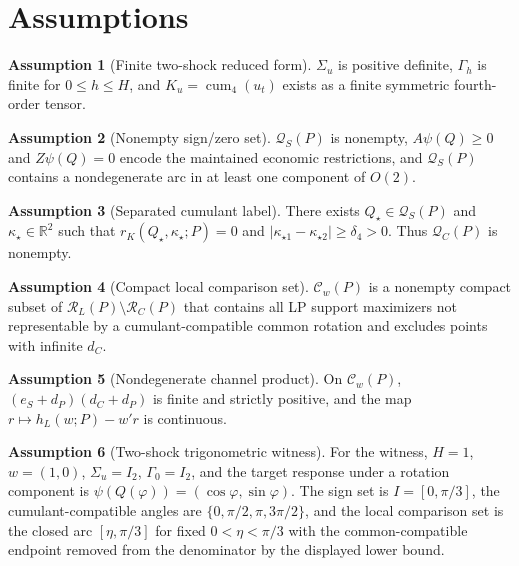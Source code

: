 \documentclass[11pt]{article}
\newcommand{\R}{\mathbb{R}}
\theoremstyle{definition}
\newtheorem{assumption}{Assumption}
\theoremstyle{plain}
\theoremstyle{remark}
\begin{document}
\section{Assumptions}
\begin{assumption}[Finite two-shock reduced form]\label{ass:finite-two}
\(\Sigma_u\) is positive definite, \(\Gamma_h\) is finite for \(0\le h\le H\), and \(K_u=\operatorname{cum}_4(u_t)\) exists as a finite symmetric fourth-order tensor.
\end{assumption}

\begin{assumption}[Nonempty sign/zero set]\label{ass:sign-zero}
\(\mathcal Q_S(P)\) is nonempty, \(A\psi(Q)\ge0\) and \(Z\psi(Q)=0\) encode the maintained economic restrictions, and \(\mathcal Q_S(P)\) contains a nondegenerate arc in at least one component of \(O(2)\).
\end{assumption}

\begin{assumption}[Separated cumulant label]\label{ass:cumulant-label}
There exists \(Q_\star\in\mathcal Q_S(P)\) and \(\kappa_\star\in\R^2\) such that \(r_K(Q_\star,\kappa_\star;P)=0\) and \(|\kappa_{\star1}-\kappa_{\star2}|\ge\delta_4>0\). Thus \(\mathcal Q_C(P)\) is nonempty.
\end{assumption}

\begin{assumption}[Compact local comparison set]\label{ass:compact-comparison}
\(\mathcal C_w(P)\) is a nonempty compact subset of \(\mathcal R_L(P)\setminus\mathcal R_C(P)\) that contains all LP support maximizers not representable by a cumulant-compatible common rotation and excludes points with infinite \(d_C\).
\end{assumption}

\begin{assumption}[Nondegenerate channel product]\label{ass:channel-product}
On \(\mathcal C_w(P)\), \((e_S+d_P)(d_C+d_P)\) is finite and strictly positive, and the map \(r\mapsto h_L(w;P)-w'r\) is continuous.
\end{assumption}

\begin{assumption}[Two-shock trigonometric witness]\label{ass:trig-witness}
For the witness, \(H=1\), \(w=(1,0)\), \(\Sigma_u=I_2\), \(\Gamma_0=I_2\), and the target response under a rotation component is \(\psi(Q(\varphi))=(\cos\varphi,\sin\varphi)\). The sign set is \(I=[0,\pi/3]\), the cumulant-compatible angles are \(\{0,\pi/2,\pi,3\pi/2\}\), and the local comparison set is the closed arc \([\eta,\pi/3]\) for fixed \(0<\eta<\pi/3\) with the common-compatible endpoint removed from the denominator by the displayed lower bound.
\end{assumption}
\end{document}
